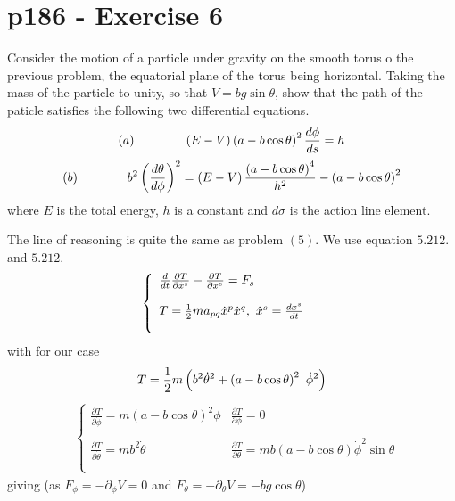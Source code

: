 \section{p186 - Exercise 6}
\begin{tcolorbox}
Consider the motion of a particle under gravity on the smooth torus o the previous problem, the equatorial plane of the torus being horizontal. Taking the mass of the particle to unity, so that $V= bg\sin{\theta}$, show that the path of the paticle satisfies the following two differential equations. 
$$(a)\quad\quad\quad\quad \left(E-V\right)\left(a-b\cos\theta\right)^2\dv{\phi}{s} = h$$
$$(b)\quad\quad\quad\quad b^2\left(\dv{\theta}{\phi}\right)^2=  \left(E-V\right)\frac{\left(a-b\cos\theta\right)^4}{h^2}-\left(a-b\cos\theta\right)^2$$
where $E$ is the total energy,  $h$ is a constant and $d\sigma$ is the action line element.
\end{tcolorbox}
The line of reasoning is quite the same as problem $(5)$.
We use equation $\mathbf{5.212.}$ and  $\mathbf{5.212.}$
\begin{align}
&\left\{\begin{array}{l}
\dv{}{t}\frac{\partial T}{\partial \dot{x}^s} - \frac{\partial T}{\partial x^s} = F_{s}\\\\
T = \frac{1}{2} m a_{pq}\dot{x}^p\dot{x}^q, \ \dot{x}^s=\dv{x^s}{t}\\\\
\end{array}\right.
\end{align}
with for our case
\begin{align}
T = \half m \left(b^2\dot{\theta}^2+ \left(a-b\cos \theta \right)^2  \ \dot{\phi}^2 \right)
\end{align}
\begin{align}
&\left\{\begin{array}{ll}
\frac{\partial T}{\partial \dot{\phi}}= m \left(a-b\cos \theta \right)^2   \dot{\phi}&\frac{\partial T}{\partial {\phi}}= 0\\\\
\frac{\partial T}{\partial \dot{\theta}}=  mb^2\dot{\theta}&\frac{\partial T}{\partial {\theta}}=  mb\left(a-b\cos \theta \right)\dot{\phi}^2\sin \theta\\\\
\end{array}\right.
\end{align}giving (as $F_{\phi} = -\partial_{\phi} V = 0$ and $F_{\theta} = -\partial_{\theta} V = -bg\cos{\theta}$)
